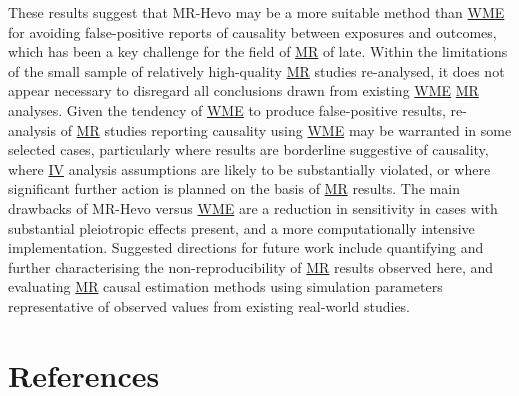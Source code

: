 \documentclass[
]{article}
\begin{document}
These results suggest that MR-Hevo may be a more suitable method than \hyperref[acronyms_WME]{WME} for avoiding false-positive reports of causality between exposures and outcomes, which has been a key challenge for the field of \hyperref[acronyms_MR]{MR} of late. Within the limitations of the small sample of relatively high-quality \hyperref[acronyms_MR]{MR} studies re-analysed, it does not appear necessary to disregard all conclusions drawn from existing \hyperref[acronyms_WME]{WME} \hyperref[acronyms_MR]{MR} analyses. Given the tendency of \hyperref[acronyms_WME]{WME} to produce false-positive results, re-analysis of \hyperref[acronyms_MR]{MR} studies reporting causality using \hyperref[acronyms_WME]{WME} may be warranted in some selected cases, particularly where results are borderline suggestive of causality, where \hyperref[acronyms_IV]{IV} analysis assumptions are likely to be substantially violated, or where significant further action is planned on the basis of \hyperref[acronyms_MR]{MR} results. The main drawbacks of MR-Hevo versus \hyperref[acronyms_WME]{WME} are a reduction in sensitivity in cases with substantial pleiotropic effects present, and a more computationally intensive implementation. Suggested directions for future work include quantifying and further characterising the non-reproducibility of \hyperref[acronyms_MR]{MR} results observed here, and evaluating \hyperref[acronyms_MR]{MR} causal estimation methods using simulation parameters representative of observed values from existing real-world studies.

\newpage

\section{References}\label{references}
\end{document}
